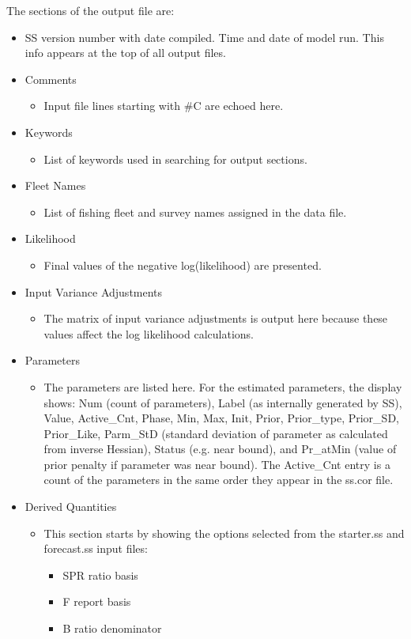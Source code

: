 The sections of the output file are:
\begin{itemize}
	\item SS version number with date compiled.  Time and date of model run.  This info appears at the top of all output files.
	\item Comments
		\begin{itemize}
			\item 	Input file lines starting with \#C are echoed here.
		\end{itemize}
	\item Keywords
		\begin{itemize}
			\item List of keywords used in searching for output sections.
		\end{itemize}
	\item Fleet Names
		\begin{itemize}
			\item List of fishing fleet and survey names assigned in the data file.
		\end{itemize}
	\item Likelihood
		\begin{itemize}
			\item Final values of the negative log(likelihood) are presented.
		\end{itemize}
	\item Input Variance Adjustments
		\begin{itemize}
			\item The matrix of input variance adjustments is output here because these values affect the log likelihood calculations.
		\end{itemize}
	\item Parameters
		\begin{itemize}
			\item The parameters are listed here.  For the estimated parameters, the display shows: Num (count of parameters), Label (as internally generated by SS), Value, Active\_Cnt, Phase, Min, Max, Init, Prior, Prior\_type, Prior\_SD, Prior\_Like, Parm\_StD (standard deviation of parameter as calculated from inverse Hessian), Status (e.g. near bound), and Pr\_atMin (value of prior penalty if parameter was near bound).  The Active\_Cnt entry is a count of the parameters in the same order they appear in the ss.cor file.
		\end{itemize}
	\item Derived Quantities
		\begin{itemize}
			\item This section starts by showing the options selected from the starter.ss and forecast.ss input files:
				\begin{itemize}
					\item SPR ratio basis
					\item F report basis
					\item B ratio denominator
				\end{itemize}
		\end{itemize}
\end{itemize}

